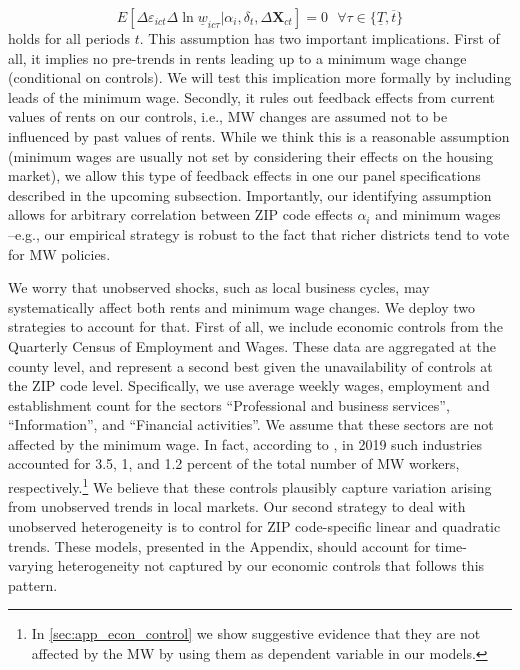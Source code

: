 \begin{equation*}
	E[\Delta \varepsilon_{ict} \Delta \ln \underline{w}_{ic\tau}  
							| \alpha_i, \delta_t, \Delta \mathbf{X}_{ct}] = 0
	\ \ \ \forall \tau \in \{\underline{T}, \overline{t} \}
\end{equation*}
holds for all periods $t$. This assumption has two important implications. First of all, 
it implies no pre-trends in rents leading up to a minimum wage change (conditional on 
controls). We will test this implication more formally by including leads of the minimum 
wage. Secondly, it rules out feedback effects from current values of rents on our controls, 
i.e., MW changes are assumed not to be influenced by past values of rents. While we think 
this is a reasonable assumption (minimum wages are usually not set by considering their 
effects on the housing market), we allow this type of feedback effects in one our panel 
specifications described in the upcoming subsection. Importantly, our identifying assumption 
allows for arbitrary correlation between ZIP code effects $\alpha_i$ and minimum wages 
--e.g., our empirical strategy is robust to the fact that richer districts tend to vote 
for MW policies.


We worry that unobserved shocks, such as local business cycles, may systematically affect 
both rents and minimum wage changes. We deploy two strategies to account for that. First 
of all, we include economic controls from the Quarterly Census of Employment and Wages. 
These data are aggregated at the county level, and represent a second best given the 
unavailability of controls at the ZIP code level. Specifically, we use average weekly wages, 
employment and establishment count for the sectors ``Professional and business services'', 
``Information'', and ``Financial activities''. We assume that these sectors are not affected 
by the minimum wage. In fact, according to \textcite[][table 5]{MinWorkersReportBLS}, in 2019 
such industries accounted for 3.5, 1, and 1.2 percent of the total number of MW workers, 
respectively.\footnote{In \autoref{sec:app_econ_control} we show suggestive evidence 
	that they are not affected by the MW by using them as dependent variable in our models.}
We believe that these controls plausibly capture variation arising from unobserved trends 
in local markets. Our second strategy to deal with unobserved heterogeneity is to control for
ZIP code-specific linear and quadratic trends. These models, presented in the Appendix, 
should account for time-varying heterogeneity not captured by our economic controls that 
follows this pattern.

